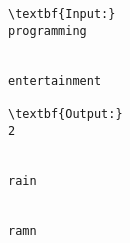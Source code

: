 \begin{verbatim}
\textbf{Input:}
programming


entertainment

\textbf{Output:}
2


rain


ramn \end{verbatim}